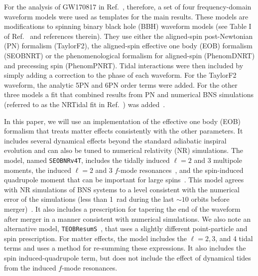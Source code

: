 \documentclass[prd,aps,letter,twocolumn,floatfix,notitlepage,nofootinbib]{revtex4-1}
\begin{document}
For the analysis of GW170817 in Ref.~\cite{BNSPE}, therefore, a set of four frequency-domain waveform models were used as templates for the main results. These models are modifications to spinning binary black hole (BBH) waveform models (see Table I of Ref.~\cite{BNSPE} and references therein). They use either the aligned-spin post-Newtonian (PN) formalism (TaylorF2), the aligned-spin effective one body (EOB) formalism (SEOBNRT) or the phenomenological formalism for aligned-spin (PhenomDNRT) and precessing spin (PhenomPNRT). Tidal interactions were then included by simply adding a correction to the phase of each waveform. For the TaylorF2 waveform, the analytic 5PN and 6PN order terms were added. For the other three models a fit that combined results from PN and numerical BNS simulations (referred to as the NRTidal fit in Ref.~\cite{BNSPE}) was added~\cite{DietrichBernuzziTichy2017}.

In this paper, we will use an implementation of the effective one body (EOB) formalism that treats matter effects consistently with the other parameters. It includes several dynamical effects beyond the standard adiabatic inspiral evolution and can also be tuned to numerical relativity (NR) simulations. The model, named \texttt{SEOBNRv4T}, includes the tidally induced $\ell=2$ and 3 multipole moments, the induced $\ell=2$ and 3 $f$-mode resonances~\cite{Hinderer:2016eia,Steinhoff:2016rfi}, and the spin-induced quadrupole moment that can be important for large spins~\cite{Poisson1998, HarryHinderer2018}. This model agrees with NR simulations of BNS systems to a level consistent with the numerical error of the simulations (less than 1~rad during the last $\sim 10$ orbits before merger)~\cite{DietrichHinderer2017, KiuchiKawaguchiKyutoku2017}. It also includes a prescription for tapering the end of the waveform after merger in a manner consistent with numerical simulations. We also note an alternative model, \texttt{TEOBResumS}~\cite{NagarBernuzziDelpozzo2018}, that uses a slightly different point-particle and spin prescription. For matter effects, the model includes the $\ell = 2, 3$, and 4 tidal terms and uses a method for re-summing these expressions. It also includes the spin induced-quadrupole term, but does not include the effect of dynamical tides from the induced $f$-mode resonances. 
\end{document}
